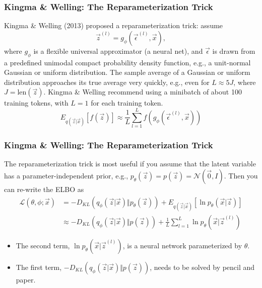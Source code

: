\documentclass{beamer}
\begin{document}
\begin{frame}
  \frametitle{Kingma \& Welling: The Reparameterization Trick}

  Kingma \& Welling (2013) proposed a reparameterization trick: assume
  \begin{displaymath}
    \vec{z}^{(l)}=g_\phi(\vec\epsilon^{(l)},\vec{x}),
  \end{displaymath}
  where $g_\phi$ is a flexible universal approximator (a neural net),
  and $\vec\epsilon$ is drawn from a predefined unimodal compact
  probability density function, e.g., a unit-normal Gaussian or
  uniform distribution.  The sample average of a Gaussian or uniform
  distribution approaches its true average very quickly, e.g., even
  for $L\approx 5J$, where $J=\mbox{len}(\vec{z})$. Kingma \& Welling
  recommend using a minibatch of about 100 training tokens, with $L=1$
  for each training token.
  \begin{displaymath}
    E_{q(\vec{z}|\vec{x})}\left[f(\vec{z})\right]\approx
    \frac{1}{L}\sum_{l=1}^L f(g_\phi(\vec\epsilon^{(l)},\vec{x}))
  \end{displaymath}
\end{frame}

\begin{frame}
  \frametitle{Kingma \& Welling: The Reparameterization Trick}

  The reparameterization trick is most useful if you assume that the
  latent variable has a parameter-independent prior, e.g.,
  $p_\theta(\vec{z})=p(\vec{z})={\mathcal N}(\vec{0},I)$.  Then you
  can re-write the ELBO as
  \begin{align*}
    {\mathcal L}\left(\theta,\phi;\vec{x}\right) &=
    -D_{KL}\left(q_\phi(\vec{z}|\vec{x})\Vert p_\theta(\vec{z})\right) +
    E_{q(\vec{z}|\vec{x})}\left[\ln p_\theta(\vec{x}|\vec{z})\right]\\
    &\approx 
    -D_{KL}\left(q_\phi(\vec{z}|\vec{x})\Vert p(\vec{z})\right) +
    \frac{1}{L}\sum_{l=1}^L\ln p_\theta(\vec{x}|\vec{z}^{(l)})
  \end{align*}
  \begin{itemize}
  \item The second term, $\ln p_\theta(\vec{x}|\vec{z}^{(l)})$, is a
    neural network parameterized by $\theta$.
  \item The first term, $-D_{KL}\left(q_\phi(\vec{z}|\vec{x})\Vert
    p(\vec{z})\right)$, needs to be solved by pencil and paper.
  \end{itemize}
\end{frame}
\end{document}
